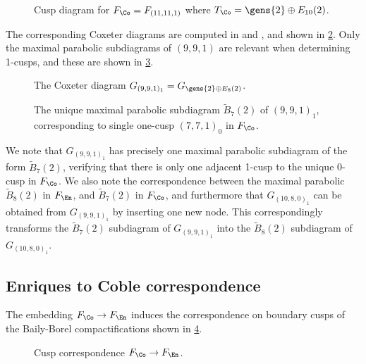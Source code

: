 \documentclass[../../main.tex]{subfiles}
\begin{document}
\begin{figure}[H]
    \centering
    
    \caption{Cusp diagram for $F_\Co = F_{(11, 11, 1)}$ where $T_\Co = \gens{2} \oplus E_{10}(2)$.}
    \label{fig:coble-cusps}
\end{figure}

The corresponding Coxeter diagrams are computed in \cite{AN06} and \cite{AEGS23}, and shown in \cref{fig:coble-coxeter-diagrams}. Only the maximal parabolic subdiagrams of $(9, 9, 1)$ are relevant when determining 1-cusps, and these are shown in \cref{fig:coble-cusp-9-9-1-parabolics}.

\begin{figure}[H]
\centering

    \caption{The Coxeter diagram $G_{(9,9,1)_1} = G_{\gens{2} \oplus E_8(2)}$.}
    \label{fig:coble-coxeter-diagrams}
\end{figure}

\begin{figure}[H]
    \centering
    
    \caption{The unique maximal parabolic subdiagram $\tilde B_7(2)$ of $(9,9,1)_1$, corresponding to single one-cusp $(7,7,1)_0$ in $F_\Co$.}
    \label{fig:coble-cusp-9-9-1-parabolics}
\end{figure}

We note that $G_{(9, 9, 1)_1}$ has precisely one maximal parabolic subdiagram of the form $\tilde B_7(2)$, verifying that there is only one adjacent 1-cusp to the unique 0-cusp in $F_\Co$. 
We also note the correspondence between the maximal parabolic $\tilde B_8(2)$ in $F_\En$, and $\tilde B_7(2)$ in $F_\Co$, and furthermore that $G_{(10, 8, 0)_1}$ can be obtained from $G_{(9, 9, 1)_1}$ by inserting one new node. This correspondingly transforms the $\tilde B_7(2)$ subdiagram of $G_{(9, 9, 1)_1}$ into the $\tilde B_8(2)$ subdiagram of $G_{(10, 8, 0)_1}$.

\subsection{Enriques to Coble correspondence}

\begin{theorem}\label{thm:cusp_correspondence}
The embedding $F_\Co\to F_\En$ induces the correspondence on boundary cusps of the Baily-Borel compactifications shown in \cref{fig:enriques-coble-correspondence}.

\begin{figure}[H]
    \centering
    
    \caption{Cusp correspondence $F_\Co \to F_\En$.}
    \label{fig:enriques-coble-correspondence}
\end{figure}

\end{theorem}
\end{document}
